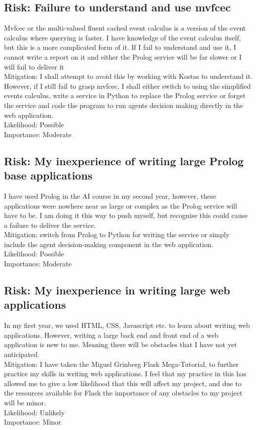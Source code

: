 \documentclass{article}
\begin{document}
\subsection*{Risk: Failure to understand and use mvfcec}
Mvfcec or the multi-valued fluent cached event calculus is a version of the event calculus where querying is faster. I have knowledge of the event calculus itself, but this is a more complicated form of it. If I fail to understand and use it, I cannot write a report on it and either the Prolog service will be far slower or I will fail to deliver it\\
Mitigation: I shall attempt to avoid this by working with Kostas to understand it. However, if I still fail to grasp mvfcec, I shall either switch to using the simplified events calculus, write a service in Python to replace the Prolog service or forget the service and code the program to run agents decision making directly in the web application.\\
Likelihood: Possible\\
Importance: Moderate

\subsection*{Risk: My inexperience of writing large Prolog base applications}
I have used Prolog in the AI course in my second year, however, these applications were nowhere near as large or complex as the Prolog service will have to be. I am doing it this way to push myself, but recognise this could cause a failure to deliver the service.\\
Mitigation: switch from Prolog to Python for writing the service or simply include the agent decision-making component in the web application.\\
Likelihood: Possible\\
Importance: Moderate

\subsection*{Risk: My inexperience in writing large web applications}
In my first year, we used HTML, CSS, Javascript etc. to learn about writing web applications. However, writing a large back end and front end of a web application is new to me. Meaning there will be obstacles that I have not yet anticipated. \\
Mitigation: I have taken the Miguel Grinberg Flask Mega-Tutorial, to further practice my skills in writing web applications. I feel that my practice in this has allowed me to give a low likelihood that this will affect my project, and due to the resources available for Flask the importance of any obstacles to my project will be minor.\\
Likelihood: Unlikely\\
Importance: Minor
\end{document}
